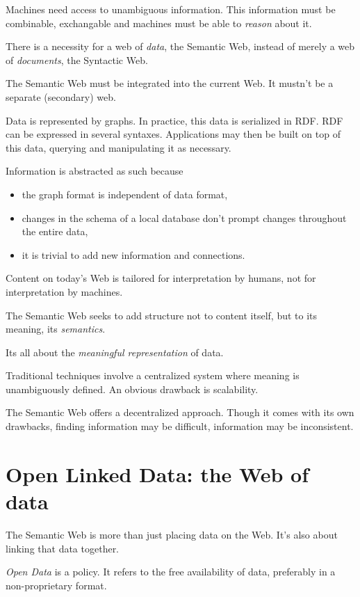 \documentclass{report}
\begin{document}
Machines need access to unambiguous information.
This information must be combinable, exchangable
and machines must be able to \emph{reason} about it.

There is a necessity for a web of \emph{data},
the Semantic Web,
instead of merely a web of \emph{documents},
the Syntactic Web.

The Semantic Web must be integrated into the current Web.
It mustn't be a separate (secondary) web.

Data is represented by graphs.
In practice, this data is serialized in RDF.
RDF can be expressed in several syntaxes.
Applications may then be built on top of this data,
querying and manipulating it as necessary.

Information is abstracted as such because
\begin{itemize}
  \item the graph format is independent of data format,
  \item changes in the schema of a local database
        don't prompt changes throughout the entire data,
  \item it is trivial to add new information and connections.
\end{itemize}

Content on today's Web is tailored 
for interpretation by humans,
not for interpretation by machines.

The Semantic Web seeks to add structure
not to content itself,
but to its meaning,
its \emph{semantics}.

Its all about the \emph{meaningful representation} of data.

Traditional techniques involve a centralized system
where meaning is unambiguously defined.
An obvious drawback is scalability.

The Semantic Web offers a decentralized approach.
Though it comes with its own drawbacks,
finding information may be difficult,
information may be inconsistent.

\section{Open Linked Data: the Web of data}

The Semantic Web is more than just placing data on the Web.
It's also about linking that data together.

\emph{Open Data} is a policy.
It refers to the free availability of data,
preferably in a non-proprietary format.
\end{document}
